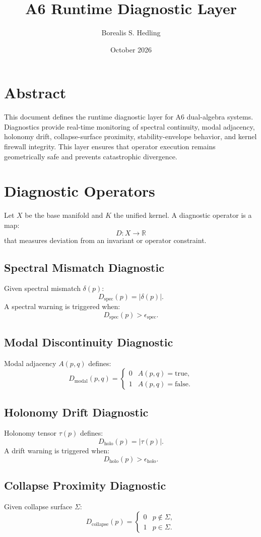 \documentclass[11pt]{article}
\title{A6 Runtime Diagnostic Layer}
\author{Borealis S. Hedling}
\date{October 2026}
\begin{document}
\maketitle

\section*{Abstract}
This document defines the runtime diagnostic layer for A6 dual-algebra systems.
Diagnostics provide real-time monitoring of spectral continuity, modal
adjacency, holonomy drift, collapse-surface proximity, stability-envelope
behavior, and kernel firewall integrity. This layer ensures that operator
execution remains geometrically safe and prevents catastrophic divergence.

\section{Diagnostic Operators}
Let $X$ be the base manifold and $K$ the unified kernel. A diagnostic operator
is a map:
\[
D : X \to \mathbb{R}
\]
that measures deviation from an invariant or operator constraint.

\subsection{Spectral Mismatch Diagnostic}
Given spectral mismatch $\delta(p)$:
\[
D_{\text{spec}}(p) = |\delta(p)|.
\]
A spectral warning is triggered when:
\[
D_{\text{spec}}(p) > \epsilon_{\text{spec}}.
\]

\subsection{Modal Discontinuity Diagnostic}
Modal adjacency $A(p,q)$ defines:
\[
D_{\text{modal}}(p,q) = 
\begin{cases}
0 & A(p,q) = \text{true}, \\
1 & A(p,q) = \text{false}.
\end{cases}
\]

\subsection{Holonomy Drift Diagnostic}
Holonomy tensor $\tau(p)$ defines:
\[
D_{\text{holo}}(p) = |\tau(p)|.
\]
A drift warning is triggered when:
\[
D_{\text{holo}}(p) > \epsilon_{\text{holo}}.
\]

\subsection{Collapse Proximity Diagnostic}
Given collapse surface $\Sigma$:
\[
D_{\text{collapse}}(p) =
\begin{cases}
0 & p \notin \Sigma, \\
1 & p \in \Sigma.
\end{cases}
\]
\end{document}
